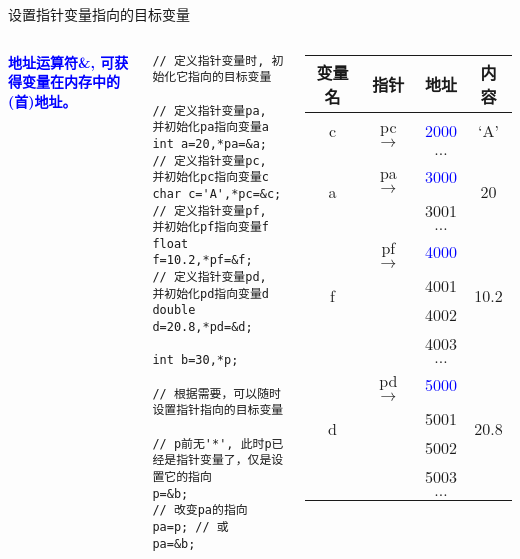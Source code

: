 \begin{frame}{设置指针变量指向的目标变量}
\begin{columns}[T]
\textbf{\textcolor{blue}{地址运算符\&, 可获得变量在内存中的(首)地址。}}
\begin{lstlisting}
// 定义指针变量时, 初始化它指向的目标变量

// 定义指针变量pa, 并初始化pa指向变量a
int a=20,*pa=&a; 
// 定义指针变量pc, 并初始化pc指向变量c
char c='A',*pc=&c; 
// 定义指针变量pf, 并初始化pf指向变量f
float f=10.2,*pf=&f; 
// 定义指针变量pd, 并初始化pd指向变量d
double d=20.8,*pd=&d;

int b=30,*p; 

// 根据需要，可以随时设置指针指向的目标变量

// p前无'*', 此时p已经是指针变量了，仅是设置它的指向
p=&b; 
// 改变pa的指向
pa=p; // 或
pa=&b;
\end{lstlisting}
\begin{tabular}{|c|c|c|c|}
	\hline 
	\textbf{变量名} & \textbf{指针} &\textbf{地址} & \textbf{内容} \\ 
	\hline 
	c & pc $\to$& \textcolor{blue}{2000} & `A' \\ 
	\hline 
	& & $\dots$ &  \\ 
	\hline 
	\multirow{2}{*}{a} &  pa $\to$ & \textcolor{blue}{3000} & \multirow{2}{*}{20} \\ \cline{3-3} 
	& & 3001 &  \\ 
	\hline 
	& & $\dots$ &  \\ 
	\hline 
	\multirow{4}{*}{f} &  pf $\to$ & \textcolor{blue}{4000} & \multirow{4}{*}{10.2}  \\ \cline{3-3} 
	& & 4001 &  \\ \cline{3-3}
	& & 4002 &  \\ \cline{3-3}
	& &4003 &  \\ 
	\hline 
	& & $\dots$ &  \\ 
	\hline 
	\multirow{4}{*}{d} &  pd $\to$ & \textcolor{blue}{5000} & \multirow{4}{*}{20.8} \\ \cline{3-3}
	& & 5001 &  \\ \cline{3-3}
	& & 5002 &  \\ \cline{3-3}
	& & 5003 &  \\ \cline{3-3}
	& & $\dots$ &  \\ 
	\hline 
\end{tabular} 
\end{columns}
\medskip
\end{frame}

